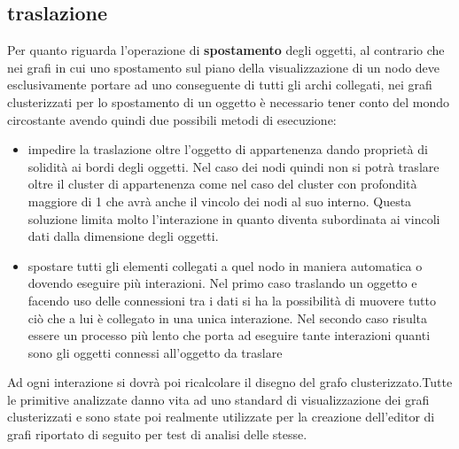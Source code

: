 {\subsection{traslazione}
Per quanto riguarda l'operazione di \textbf{spostamento }degli oggetti, al contrario che nei grafi in cui uno spostamento sul piano della visualizzazione di un nodo deve esclusivamente portare ad uno conseguente di tutti gli archi collegati, nei grafi clusterizzati per lo spostamento di un oggetto è necessario tener conto del mondo circostante avendo quindi due possibili metodi di esecuzione:
\begin{itemize}
	\item impedire la traslazione oltre l'oggetto di appartenenza dando proprietà di solidità ai bordi degli oggetti. Nel caso dei nodi quindi non si potrà traslare oltre il cluster di appartenenza come nel caso del cluster con profondità maggiore di 1 che avrà anche il vincolo dei nodi al suo interno. Questa soluzione limita molto l'interazione in quanto diventa subordinata ai vincoli dati dalla dimensione degli oggetti.
	\item spostare tutti gli elementi collegati a quel nodo in maniera automatica o dovendo eseguire più interazioni. Nel primo caso traslando un oggetto e facendo uso delle connessioni tra i dati si ha la possibilità di muovere tutto ciò che a lui è collegato in una unica interazione. Nel secondo caso risulta essere un processo più lento che porta ad eseguire tante interazioni quanti sono gli oggetti connessi all'oggetto da traslare
\end{itemize}
Ad ogni interazione si dovrà poi ricalcolare il disegno del grafo clusterizzato.Tutte le primitive analizzate danno vita ad uno standard di visualizzazione dei grafi clusterizzati e sono state poi realmente utilizzate per la creazione dell'editor di grafi riportato di seguito per test di analisi delle stesse.
}
